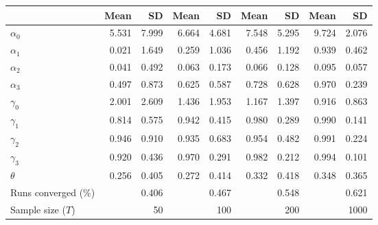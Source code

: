 
\begin{tabular}[t]{lrrrrrrrr}
\toprule
  & Mean & SD & Mean  & SD  & Mean   & SD   & Mean    & SD   \\
\midrule
$\alpha_{0}$ & 5.531 & 7.999 & 6.664 & 4.681 & 7.548 & 5.295 & 9.724 & 2.076\\
$\alpha_{1}$ & 0.021 & 1.649 & 0.259 & 1.036 & 0.456 & 1.192 & 0.939 & 0.462\\
$\alpha_{2}$ & 0.041 & 0.492 & 0.063 & 0.173 & 0.066 & 0.128 & 0.095 & 0.057\\
$\alpha_{3}$ & 0.497 & 0.873 & 0.625 & 0.587 & 0.728 & 0.628 & 0.970 & 0.239\\
$\gamma_{0}$ & 2.001 & 2.609 & 1.436 & 1.953 & 1.167 & 1.397 & 0.916 & 0.863\\
$\gamma_{1}$ & 0.814 & 0.575 & 0.942 & 0.415 & 0.980 & 0.289 & 0.990 & 0.141\\
$\gamma_{2}$ & 0.946 & 0.910 & 0.935 & 0.683 & 0.954 & 0.482 & 0.991 & 0.224\\
$\gamma_{3}$ & 0.920 & 0.436 & 0.970 & 0.291 & 0.982 & 0.212 & 0.994 & 0.101\\
$\theta$ & 0.256 & 0.405 & 0.272 & 0.414 & 0.332 & 0.418 & 0.348 & 0.365\\
Runs converged (\%) &  & 0.406 &  & 0.467 &  & 0.548 &  & 0.621\\
Sample size ($T$) &  & 50 &  & 100 &  & 200 &  & 1000\\
\bottomrule
\end{tabular}
